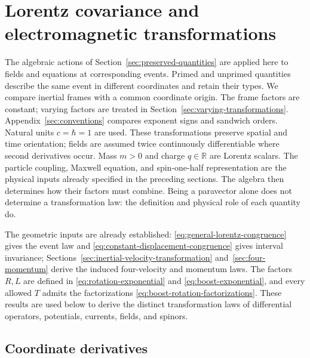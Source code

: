 \documentclass[11pt]{article}
\newcommand{\pv}[1]{{#1}}
\newcommand{\pL}{\pv{L}}
\newcommand{\pR}{\pv{R}}
\newcommand{\pT}{\pv{T}}
\numberwithin{equation}{section}
\newcommand{\R}{\mathbb{R}}
\begin{document}
\section{Lorentz covariance and electromagnetic transformations}
\label{sec:transformations}

The algebraic actions of Section~\ref{sec:preserved-quantities} are applied
here to fields and equations at corresponding events. Primed and unprimed
quantities describe the same event in different coordinates and retain
their types. We compare inertial frames with a common coordinate origin.
The frame factors are constant; varying factors are treated
in Section~\ref{sec:varying-transformations}. Appendix~\ref{sec:conventions}
compares exponent signs and sandwich orders.
Natural units $c=\hbar=1$ are used. These transformations preserve spatial
and time orientation; fields are assumed twice continuously differentiable
where second derivatives occur.
Mass $m>0$ and charge $q\in\R$ are Lorentz scalars. The particle coupling,
Maxwell equation, and spin-one-half representation are the physical inputs
already specified in the preceding sections. The algebra then determines
how their factors must combine. Being a paravector alone does not determine
a transformation law: the definition and physical role of each quantity do.

The geometric inputs are already established:
\eqref{eq:general-lorentz-congruence} gives the event law and
\eqref{eq:constant-displacement-congruence} gives interval invariance;
Sections~\ref{sec:inertial-velocity-transformation} and~\ref{sec:four-momentum} derive
the induced four-velocity and momentum laws. The factors $\pR,\pL$
are defined in \eqref{eq:rotation-exponential} and
\eqref{eq:boost-exponential}, and every allowed $\pT$ admits the
factorizations \eqref{eq:boost-rotation-factorizations}.
These results are used below to derive the distinct transformation
laws of differential operators, potentials, currents, fields, and spinors.

\subsection{Coordinate derivatives}
\end{document}
